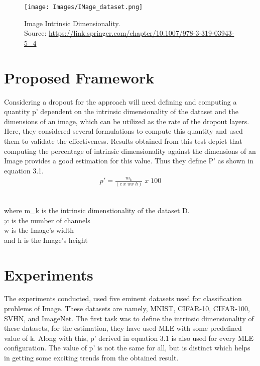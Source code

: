 \documentclass[12pt,letterpaper]{report}
\begin{document}
\begin{figure}[h]
    \centering
    \texttt{[image: Images/IMage\_dataset.png]}
    \caption{Image Intrinsic Dimensionality. \\
    Source: \href{https://link.springer.com/chapter/10.1007/978-3-319-03943-5_4}{https://link.springer.com/chapter/10.1007/978-3-319-03943-5_4}}
    \label{fig:Image Intrinsic Dimensionality}
\end{figure}

\section{Proposed Framework}
Considering a dropout for the approach will need defining and computing a quantity p' dependent on the intrinsic dimensionality of the dataset and the dimensions of an image, which can be utilized as the rate of the dropout layers. Here, they considered several formulations to compute this quantity and used them to validate the effectiveness. Results obtained from this test depict that computing the percentage of intrinsic dimensionality against the dimensions of an Image provides a good estimation for this value. Thus they define P' as shown in equation 3.1.\\

\begin{align}
    \label{eq:example}
    p' = \frac{m_k}{(c\; x\; w x\; h)} \;x\;100 
\end{align}
\\

\begin{center}
    where m\_k is the intrinsic dimenstionality of the dataset D.\\
      \;\;;c is the number of channels\cite{12}\\
    w is the Image's width\\
    and h is the Image's height
\end{center}
    
\section{Experiments}
The experiments conducted, used five eminent datasets used for classification problems of Image. These datasets are namely, MNIST, CIFAR-10, CIFAR-100, SVHN, and ImageNet. The first task was to define the intrinsic dimensionality of these datasets, for the estimation, they have used MLE with some predefined value of k. Along with this, p'  derived in equation 3.1 is also used for every MLE configuration. The value of p' is not the same for all, but is distinct which helps in getting some exciting trends from the obtained result. \\
\end{document}
